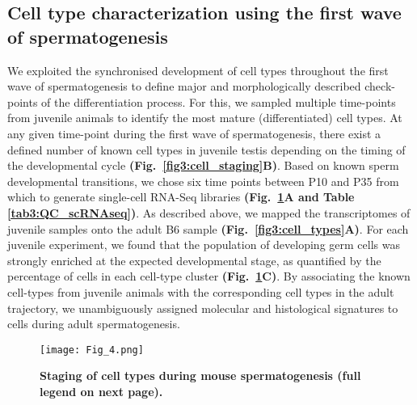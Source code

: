 \subsection{Cell type characterization using the first wave of spermatogenesis}
 
We exploited the synchronised development of cell types throughout the first wave of spermatogenesis to define major and morphologically described check-points of the differentiation process. For this, we sampled multiple time-points from juvenile animals to identify the most mature (differentiated) cell types. At any given time-point during the first wave of spermatogenesis, there exist a defined number of known cell types in juvenile testis depending on the timing of the developmental cycle \textbf{(Fig.~\ref{fig3:cell_staging}B)}. Based on known sperm developmental transitions, we chose six time points between P10 and P35 from which to generate single-cell RNA-Seq libraries \textbf{(Fig.~\ref{fig3:1st_wave}A and Table \ref{tab3:QC_scRNAseq})}. As described above, we mapped the transcriptomes of juvenile samples onto the adult B6 sample \textbf{(Fig.~\ref{fig3:cell_types}A)}. For each juvenile experiment, we found that the population of developing germ cells was strongly enriched at the expected developmental stage, as quantified by the percentage of cells in each cell-type cluster \textbf{(Fig.~\ref{fig3:1st_wave}C)}. By associating the known cell-types from juvenile animals with the corresponding cell types in the adult trajectory, we unambiguously assigned molecular and histological signatures to cells during adult spermatogenesis.

\newpage

\begin{figure}[!h]
\centering
\texttt{[image: Fig\_4.png]}
\caption[Staging of cell types during mouse spermatogenesis]{\textbf{Staging of cell types during mouse spermatogenesis (full legend on next page).}}
\label{fig3:1st_wave}
\end{figure}

\newpage

